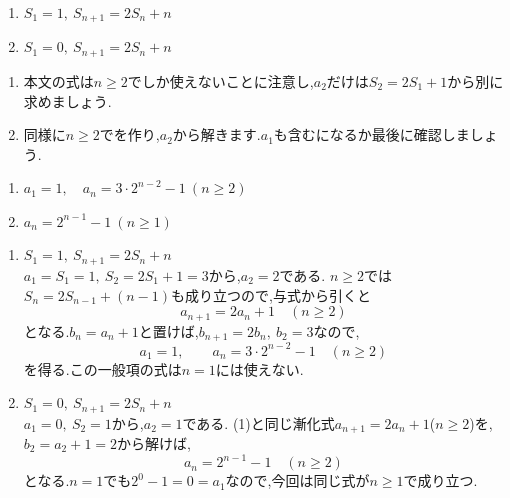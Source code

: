     \noindent {}\par\nobreak
    \begin{enumerate}[label=(\arabic*),parsep=3pt,format=\bookitemlink{example-summation-2}{problem}{hint}]
      \item $S_1=1,\ S_{n+1}=2S_n+n$
      \item $S_1=0,\ S_{n+1}=2S_n+n$
    \end{enumerate}
    
    \noindent{}\par\nobreak
    \begin{enumerate}[label=(\arabic*),parsep=3pt,format=\bookitemlink{example-summation-2}{hint}{answer}]
      \item 本文の式は$n\ge2$でしか使えないことに注意し,$a_2$だけは$S_2=2S_1+1$から別に求めましょう.
      \item 同様に$n\ge2$でを作り,$a_2$から解きます.$a_1$も含むになるか最後に確認しましょう.
    \end{enumerate}
    
    \noindent{}\par\nobreak
    \begin{enumerate}[label=(\arabic*),parsep=3pt,format=\bookitemlink{example-summation-2}{answer}{solution}]
      \item $a_1=1,\quad a_n=3\cdot2^{n-2}-1\ (n\ge2)$
      \item $a_n=2^{n-1}-1\ (n\ge1)$
    \end{enumerate}
    
    \noindent{}\par\nobreak
    \begin{enumerate}[label=(\arabic*),parsep=3pt,format=\bookitemlink{example-summation-2}{solution}{problem}]
      \item $S_1=1,\ S_{n+1}=2S_n+n$\\
        $a_1=S_1=1,\ S_2=2S_1+1=3$から,$a_2=2$である.
        $n\ge2$では$S_n=2S_{n-1}+(n-1)$も成り立つので,与式から引くと
        \[
          a_{n+1}=2a_n+1\quad(n\ge2)
        \]
        となる.$b_n=a_n+1$と置けば,$b_{n+1}=2b_n,\ b_2=3$なので,
        \[
          a_1=1,\qquad a_n=3\cdot2^{n-2}-1\quad(n\ge2)
        \]
        を得る.この一般項の式は$n=1$には使えない.
      \item $S_1=0,\ S_{n+1}=2S_n+n$\\
        $a_1=0,\ S_2=1$から,$a_2=1$である.
        (1)と同じ漸化式$a_{n+1}=2a_n+1$($n\ge2$)を,$b_2=a_2+1=2$から解けば,
        \[
          a_n=2^{n-1}-1\quad(n\ge2)
        \]
        となる.$n=1$でも$2^0-1=0=a_1$なので,今回は同じ式が$n\ge1$で成り立つ.
    \end{enumerate}
